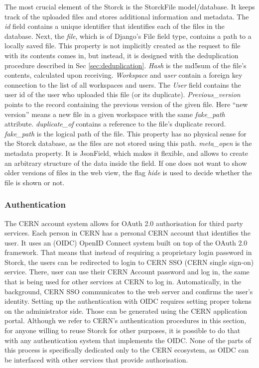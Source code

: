 The most crucial element of the Storck is the StorckFile model/database. It keeps track of the uploaded files and stores additional information and metadata.
The \textit{id} field contains a unique identifier that identifies each of the files in the database.
Next, the \textit{file}, which is of Django's File field type, contains a path to a locally saved file.
This property is not implicitly created as the request to file with its contents comes in, but instead, it is designed with the deduplication procedure described in Sec \ref{sec:deduplication}.
\textit{Hash} is the md5sum of the file's contents, calculated upon receiving.
\textit{Workspace} and \textit{user} contain a foreign key connection to the list of all workspaces and users.
The \textit{User} field contains the user id of the user who uploaded this file (or its duplicate).
\textit{Previous\_version} points to the record containing the previous version of the given file.
Here ``new version'' means a new file in a given workspace with the same \textit{fake\_path} attribute.
\textit{duplicate\_of} contains a reference to the file's duplicate record.
\textit{fake\_path} is the logical path of the file.
This property has no physical sense for the Storck database, as the files are not stored using this path.
\textit{meta\_open} is the metadata property.
It is JsonField, which makes it flexible, and allows to create an arbitrary structure of the data inside the field.
If one does not want to show older versions of files in the web view, the flag \textit{hide} is used to decide whether the file is shown or not.


\subsubsection{Authentication}
The CERN account system allows for OAuth 2.0 \cite{rfc6819} authorisation for third party services.
Each person in CERN has a personal CERN account that identifies the user.
It uses an (OIDC) OpenID Connect system built on top of the OAuth 2.0 framework.
That means that instead of requiring a proprietary login password in Storck, the users can be redirected to login to CERN SSO (CERN single sign-on) service.
There, user can use their CERN Account password and log in, the same that is being used for other services at CERN to log in.
Automatically, in the background, CERN SSO communicates to the web server and confirms the user's identity.
Setting up the authentication with OIDC requires setting proper tokens on the administrator side. Those can be generated using the CERN application portal.
Although we refer to CERN's authentication procedures in this section, for anyone willing to reuse Storck for other purposes, it is possible to do that with any authentication system that implements the OIDC.
None of the parts of this process is specifically dedicated only to the CERN ecosystem, as OIDC can be interfaced with other services that provide authorisation.


